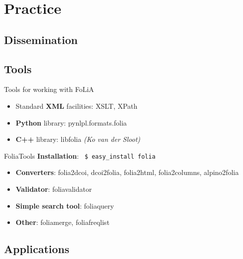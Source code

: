 \documentclass[compress]{beamer}
\begin{document}
\section{Practice}
\subsection{Dissemination}

\subsection{Tools}

\begin{frame}
	\begin{block}{Tools for working with FoLiA}
		\begin{itemize}
			\item Standard \textbf{XML} facilities: XSLT, XPath
			\item \textbf{Python} library: pynlpl.formats.folia
			\item \textbf{C++} library: libfolia \emph{(Ko van der Sloot)}
		\end{itemize}
	\end{block}
	
	\begin{block}{FoliaTools}
		\textbf{Installation}: \texttt{ \$ easy\_install folia}
		\begin{itemize}
			\item \textbf{Converters}: folia2dcoi, dcoi2folia, folia2html, folia2columns, alpino2folia
			\item \textbf{Validator}: foliavalidator
			\item \textbf{Simple search tool}: foliaquery
			\item \textbf{Other}: foliamerge, foliafreqlist
		\end{itemize}
	\end{block}
\end{frame}

\subsection{Applications}
\end{document}
